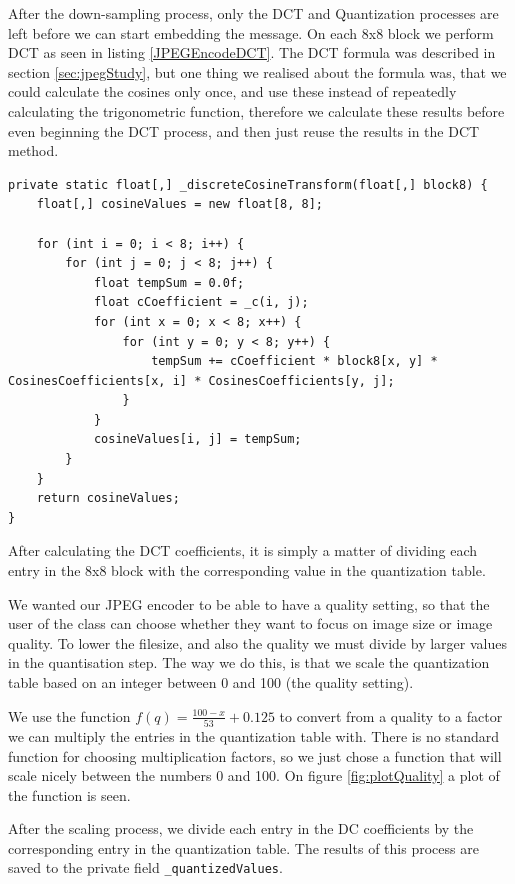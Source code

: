 After the down-sampling process, only the DCT and Quantization processes are left before we can start embedding the message.
On each 8x8 block we perform DCT as seen in listing \ref{JPEGEncodeDCT}.
The DCT formula was described in section \ref{sec:jpegStudy}, but one thing we realised about the formula was, that we could calculate the cosines only once, and use these instead of repeatedly calculating the trigonometric function, therefore we calculate these results before even beginning the DCT process, and then just reuse the results in the DCT method.
 

\begin{lstlisting}[firstnumber=603,label=JPEGEncodeDCT, caption={Multidimensional DCT on 8x8 block \textbf{File: }JPEGImage.cs}]
private static float[,] _discreteCosineTransform(float[,] block8) {
    float[,] cosineValues = new float[8, 8];

    for (int i = 0; i < 8; i++) {
        for (int j = 0; j < 8; j++) {
            float tempSum = 0.0f;
            float cCoefficient = _c(i, j);
            for (int x = 0; x < 8; x++) {
                for (int y = 0; y < 8; y++) {
                    tempSum += cCoefficient * block8[x, y] * CosinesCoefficients[x, i] * CosinesCoefficients[y, j];
                }
            }
            cosineValues[i, j] = tempSum;
        }
    }
    return cosineValues;
}
\end{lstlisting}

\FloatBarrier

After calculating the DCT coefficients, it is simply a matter of dividing each entry in the 8x8 block with the corresponding value in the quantization table.

We wanted our JPEG encoder to be able to have a quality setting, so that the user of the class can choose whether they want to focus on image size or image quality. To lower the filesize, and also the quality we must divide by larger values in the quantisation step. The way we do this, is that we scale the quantization table based on an integer between 0 and 100 (the quality setting).

We use the function $f(q) = \frac{100-x}{53}+0.125$ to convert from a quality to a factor we can multiply the entries in the quantization table with. There is no standard function for choosing multiplication factors, so we just chose a function that will scale nicely between the numbers 0 and 100. On figure \ref{fig:plotQuality} a plot of the function is seen.

After the scaling process, we divide each entry in the DC coefficients by the corresponding entry in the quantization table. The results of this process are saved to the private field \lstinline|_quantizedValues|.

